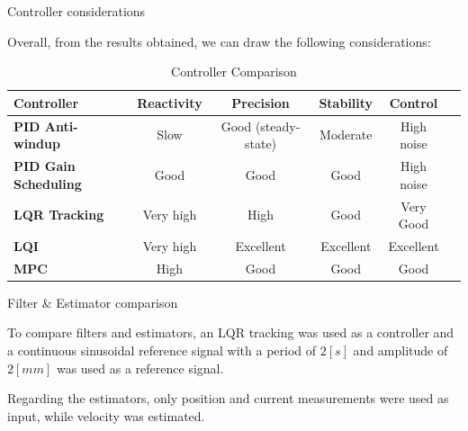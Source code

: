 \begin{frame}{Controller considerations}

    Overall, from the results obtained, we can draw the following considerations:

    \begin{table}[H]
        \centering
        \renewcommand{\arraystretch}{1}
        \begin{tabular}{|l|c|c|c|c|l|}
            \hline
            \textbf{Controller}          & \textbf{Reactivity} & \textbf{Precision}  & \textbf{Stability} & \textbf{Control} \\ \hline
            \textbf{PID Anti-windup}     & Slow                & Good (steady-state) & Moderate           & High noise       \\ \hline
            \textbf{PID Gain Scheduling} & Good                & Good                & Good               & High noise       \\ \hline
            \textbf{LQR Tracking}        & Very high           & High                & Good               & Very Good        \\ \hline
            \textbf{LQI}                 & Very high           & Excellent           & Excellent          & Excellent        \\ \hline
            \textbf{MPC}                 & High                & Good                & Good               & Good             \\ \hline
        \end{tabular}
        \caption{Controller Comparison}
    \end{table}


\end{frame}


\begin{frame}{Filter \& Estimator comparison}

    To compare filters and estimators, an LQR tracking was used as a controller and a continuous sinusoidal reference signal with a period of $2[s]$ and amplitude of $2[mm]$ was used as a reference signal.

    \vspace{9pt}

    Regarding the estimators, only position and current measurements were used as input, while velocity was estimated.

\end{frame}


